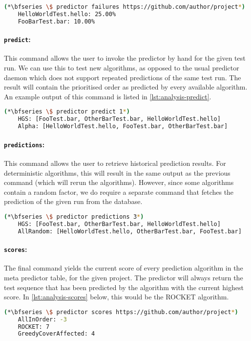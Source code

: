 \begin{lstlisting}[language=bash, caption=Example output of the failures-command, label=lst:analysis-failures]
	(*\bfseries \$ predictor failures https://github.com/author/project*)
	HelloWorldTest.hello: 25.00%
	FooBarTest.bar: 10.00%
\end{lstlisting}

\paragraph*{\texttt{predict}:} This command allows the user to invoke the predictor by hand for the given test run. We can use this to test new algorithms, as opposed to the usual predictor daemon which does not support repeated predictions of the same test run. The result will contain the prioritised order as predicted by every available algorithm. An example output of this command is listed in \cref{lst:analysis-predict}.

\begin{lstlisting}[language=bash, caption=Example output of the predict-command, label=lst:analysis-predict]
	(*\bfseries \$ predictor predict 1*)
	HGS: [FooTest.bar, OtherBarTest.bar, HelloWorldTest.hello]
	Alpha: [HelloWorldTest.hello, FooTest.bar, OtherBarTest.bar]
\end{lstlisting}

\paragraph*{\texttt{predictions}:} This command allows the user to retrieve historical prediction results. For deterministic algorithms,  this will result in the same output as the previous command (which will rerun the algorithms). However, since some algorithms contain a random factor, we do require a separate command that fetches the prediction of the given run from the database.

\begin{lstlisting}[language=bash, caption=Example output of the predictions-command, label=lst:analysis-predictions]
	(*\bfseries \$ predictor predictions 3*)
	HGS: [FooTest.bar, OtherBarTest.bar, HelloWorldTest.hello]
	AllRandom: [HelloWorldTest.hello, OtherBarTest.bar, FooTest.bar]
\end{lstlisting}
	
\paragraph*{\texttt{scores}:} The final command yields the current score of every prediction algorithm in the meta predictor table, for the given project. The predictor will always return the test sequence that has been predicted by the algorithm with the current highest score. In \cref{lst:analysis-scores} below, this would be the ROCKET algorithm.
	
\begin{lstlisting}[language=bash, caption=Example output of the scores-command, label=lst:analysis-scores]
	(*\bfseries \$ predictor scores https://github.com/author/project*)
	AllInOrder: -3
	ROCKET: 7
	GreedyCoverAffected: 4
\end{lstlisting}